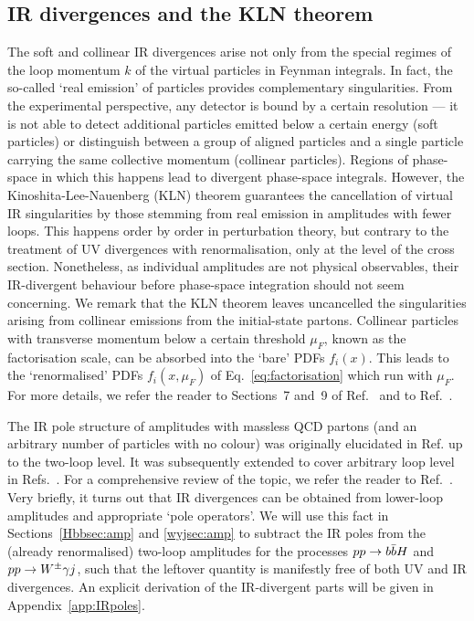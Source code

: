 \documentclass[main.tex]{subfiles}
\begin{document}
\subsection{IR divergences and the KLN theorem} \label{sec:IRdivergencesandKLN}
The soft and collinear IR divergences arise not only from the special regimes of the loop momentum $k$ of the virtual particles in Feynman integrals. In fact, the so-called `real emission' of particles provides complementary singularities. From the experimental perspective, any detector is bound by a certain resolution --- it is not able to detect additional particles emitted below a certain energy (soft particles) or distinguish between a group of aligned particles and a single particle carrying the same collective momentum (collinear particles). Regions of phase-space in which this happens lead to divergent phase-space integrals. However, the Kinoshita-Lee-Nauenberg (KLN) theorem guarantees the cancellation of virtual IR singularities by those stemming from real emission in amplitudes with fewer loops\cite{10.1063/1.1724268, PhysRev.133.B1549}. This happens order by order in perturbation theory, but contrary to the treatment of UV divergences with renormalisation, only at the level of the cross section. Nonetheless, as individual amplitudes are not physical observables, their IR-divergent behaviour before phase-space integration should not seem concerning. We remark that the KLN theorem leaves uncancelled the singularities arising from collinear emissions from the initial-state partons. Collinear particles with transverse momentum below a certain threshold $\mu_F$, known as the factorisation scale, can be absorbed into the `bare' PDFs $f_i(x)$. This leads to the `renormalised' PDFs $f_i(x, \mu_F)$ of Eq.~\ref{eq:factorisation} which run with $\mu_F$. For more details, we refer the reader to Sections~7 and~9 of Ref.~\cite{ellis2003qcd} and to Ref.~\cite{Collins:1989gx}.

The IR pole structure of amplitudes with massless QCD partons (and an arbitrary number of particles with no colour) was originally elucidated in Ref.\cite{Catani:1998bh} up to the two-loop level. It was subsequently extended to cover arbitrary loop level in Refs.~\cite{Becher:2009cu, Becher:2009qa, Gardi:2009qi}. For a comprehensive review of the topic, we refer the reader to Ref.~\cite{Agarwal:2021ais}. Very briefly, it turns out that IR divergences can be obtained from lower-loop amplitudes and appropriate `pole operators'. We will use this fact in Sections~\ref{Hbbsec:amp} and \ref{wyjsec:amp} to subtract the IR poles from the (already renormalised) two-loop amplitudes for the processes $pp \rightarrow b\bar{b}H$ and $pp \rightarrow W^\pm \gamma j$, such that the leftover quantity is manifestly free of both UV and IR divergences. An explicit derivation of the IR-divergent parts will be given in Appendix~\ref{app:IRpoles}.
\end{document}
